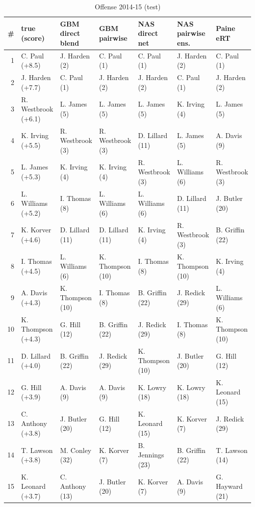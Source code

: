 \documentclass[10pt]{article}
\begin{document}
\begin{table}[ht]\centering\scriptsize
\caption{Offense 2014-15 (test)}
\begin{tabular}{rllllll}
\toprule
\# & true (score) & GBM direct blend & GBM pairwise & NAS direct net & NAS pairwise ens. & Paine eRT \\
\midrule
1 & C. Paul (+8.5) & J. Harden (2) & C. Paul (1) & C. Paul (1) & J. Harden (2) & C. Paul (1) \\
2 & J. Harden (+7.7) & C. Paul (1) & J. Harden (2) & J. Harden (2) & C. Paul (1) & J. Harden (2) \\
3 & R. Westbrook (+6.1) & L. James (5) & L. James (5) & L. James (5) & K. Irving (4) & L. James (5) \\
4 & K. Irving (+5.5) & R. Westbrook (3) & R. Westbrook (3) & D. Lillard (11) & L. James (5) & A. Davis (9) \\
5 & L. James (+5.3) & K. Irving (4) & K. Irving (4) & R. Westbrook (3) & L. Williams (6) & R. Westbrook (3) \\
6 & L. Williams (+5.2) & I. Thomas (8) & L. Williams (6) & L. Williams (6) & D. Lillard (11) & J. Butler (20) \\
7 & K. Korver (+4.6) & D. Lillard (11) & D. Lillard (11) & K. Irving (4) & R. Westbrook (3) & B. Griffin (22) \\
8 & I. Thomas (+4.5) & L. Williams (6) & K. Thompson (10) & I. Thomas (8) & K. Thompson (10) & K. Irving (4) \\
9 & A. Davis (+4.3) & K. Thompson (10) & I. Thomas (8) & B. Griffin (22) & J. Redick (29) & L. Williams (6) \\
10 & K. Thompson (+4.3) & G. Hill (12) & B. Griffin (22) & J. Redick (29) & I. Thomas (8) & K. Thompson (10) \\
11 & D. Lillard (+4.0) & B. Griffin (22) & J. Redick (29) & K. Thompson (10) & J. Butler (20) & G. Hill (12) \\
12 & G. Hill (+3.9) & A. Davis (9) & A. Davis (9) & K. Lowry (18) & K. Lowry (18) & K. Leonard (15) \\
13 & C. Anthony (+3.8) & J. Butler (20) & G. Hill (12) & K. Leonard (15) & K. Korver (7) & J. Redick (29) \\
14 & T. Lawson (+3.8) & M. Conley (32) & K. Korver (7) & B. Jennings (23) & B. Griffin (22) & T. Lawson (14) \\
15 & K. Leonard (+3.7) & C. Anthony (13) & J. Butler (20) & K. Korver (7) & A. Davis (9) & G. Hayward (21) \\
\bottomrule
\end{tabular}
\end{table}
\end{document}
